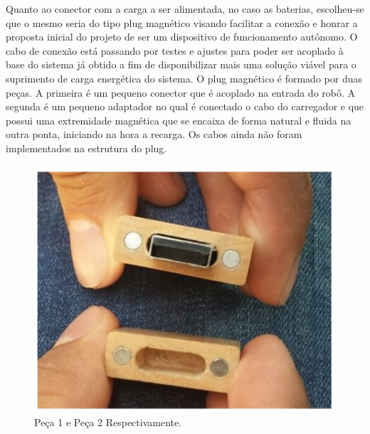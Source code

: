 Quanto ao conector com a carga a ser alimentada, no caso as baterias, escolheu-se que o mesmo seria do tipo plug magnético visando facilitar a conexão e honrar a proposta inicial do projeto de ser um dispositivo de funcionamento autônomo. O cabo de conexão está passando por testes e ajustes para poder ser acoplado à base do sistema já obtido a fim de disponibilizar mais uma solução viável para o suprimento de carga energética do sistema.
O plug magnético é formado por duas peças. A primeira é um pequeno conector que é acoplado na entrada do robô. A segunda é um pequeno adaptador no qual é conectado o cabo do carregador e que possui uma extremidade magnética que se encaixa de forma natural e fluida na outra ponta, iniciando na hora a recarga. Os cabos ainda não foram implementados na estrutura do plug.

 \begin{figure}[H]
	\centering
	\includegraphics[scale=0.5]{figuras/peca1peca2}
	\caption{Peça 1 e Peça 2 Respectivamente.}
	\label{img:peca1peca2}
\end{figure}

